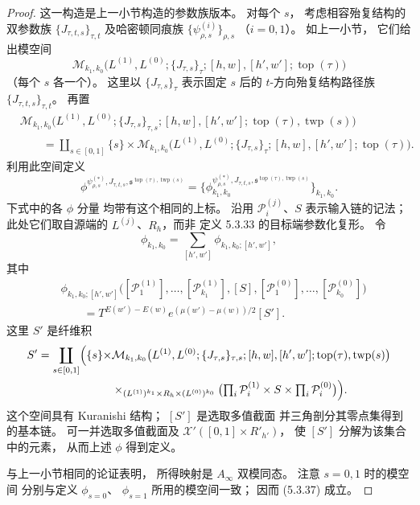 \begin{proof}
这一构造是上一小节构造的参数族版本。
对每个 $s$，
考虑相容殆复结构的双参数族
$\{J_{\tau,t,s}\}_{\tau,t}$
及哈密顿同痕族
$\{\psi^{(i)}_{\rho,s}\}_{\rho,s}$
（$i=0,1$）。
如上一小节，
它们给出模空间
\[
\mathcal M_{k_1,k_0}
\bigl(
L^{(1)},L^{(0)};
\{J_{\tau,s}\}_\tau;
[h,w],[h',w'];
\operatorname{top}(\tau)
\bigr)
\]
（每个 $s$ 各一个）。
这里以
$\{J_{\tau,s}\}_\tau$
表示固定 $s$ 后的
$t$-方向殆复结构路径族
$\{J_{\tau,t,s}\}_{\tau,t}$。
再置
\[
\begin{aligned}
&\mathcal M_{k_1,k_0}
\bigl(
L^{(1)},L^{(0)};
\{J_{\tau,s}\}_{\tau,s};
[h,w],[h',w'];
\operatorname{top}(\tau),
\operatorname{twp}(s)
\bigr)\\
&\qquad=
\coprod_{s\in[0,1]}\{s\}\times
\mathcal M_{k_1,k_0}
\bigl(
L^{(1)},L^{(0)};
\{J_{\tau,s}\}_{\tau};
[h,w],[h',w'];
\operatorname{top}(\tau)
\bigr).
\end{aligned}
\]
利用此空间定义
\[
\phi^{
\psi_{\rho,s}^{(*)},J_{\tau,t,s},
\mathfrak s^{\operatorname{top}(\tau),
\operatorname{twp}(s)}}
=
\bigl\{
\phi_{k_1,k_0}^{
\psi_{\rho,s}^{(*)},J_{\tau,t,s},
\mathfrak s^{\operatorname{top}(\tau),
\operatorname{twp}(s)}}
\bigr\}_{k_1,k_0}.
\]
下式中的各 $\phi$ 分量
均带有这个相同的上标。
沿用 $\mathcal P_i^{(j)}$、$S$
表示输入链的记法；
此处它们取自源端的
$L^{(j)}$、$R_h$，而非
定义 5.3.33 的目标端参数化复形。
令
\[
\phi_{k_1,k_0}
=\sum_{[h',w']}
\phi_{k_1,k_0;[h',w']},
\]
其中
\[
\begin{aligned}
&\phi_{k_1,k_0;[h',w']}
\bigl(
[\mathcal P_1^{(1)}],\ldots,
[\mathcal P_{k_1}^{(1)}],[S],
[\mathcal P_1^{(0)}],\ldots,
[\mathcal P_{k_0}^{(0)}]
\bigr)\\
&\qquad=
T^{E(w')-E(w)}
e^{(\mu(w')-\mu(w))/2}[S'].
\end{aligned}
\]
这里 $S'$ 是纤维积
\[
\begin{aligned}
S'=\coprod_{s\in[0,1]}
\Bigl(\{s\}\times
&\mathcal M_{k_1,k_0}
\bigl(
L^{(1)},L^{(0)};
\{J_{\tau,s}\}_{\tau,s};
[h,w],[h',w'];
\operatorname{top}(\tau),
\operatorname{twp}(s)
\bigr)\\
&\times_{
(L^{(1)})^{k_1}\times R_h
\times(L^{(0)})^{k_0}}
\bigl(
\textstyle\prod_i\mathcal P_i^{(1)}
\times S
\times\prod_i\mathcal P_i^{(0)}
\bigr)\Bigr).
\end{aligned}
\]
这个空间具有 Kuranishi 结构；
$[S']$ 是选取多值截面
并三角剖分其零点集得到的基本链。
可一并选取多值截面及
$\mathcal X'([0,1]\times R'_{h'})$，
使 $[S']$ 分解为该集合中的元素，
从而上述 $\phi$ 得到定义。

与上一小节相同的论证表明，
所得映射是
$A_\infty$ 双模同态。
注意 $s=0,1$ 时的模空间
分别与定义
$\phi_{s=0}$、
$\phi_{s=1}$
所用的模空间一致；
因而 (5.3.37) 成立。


\end{proof}
